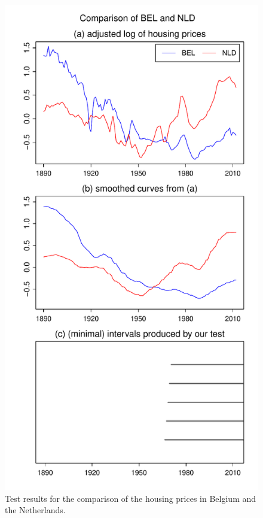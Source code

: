 \documentclass[a4paper,12pt]{article}
\begin{document}
\begin{figure}[t!]
\begin{minipage}[t]{0.49\textwidth}
\includegraphics[width=\textwidth]{output/plots/hp/hp_BEL_vs_NLD}
\caption{Test results for the comparison of the housing prices in Belgium and the Netherlands.}\label{fig:hp:Belgium:Netherlands}
\end{minipage}

\end{figure}
\end{document}
